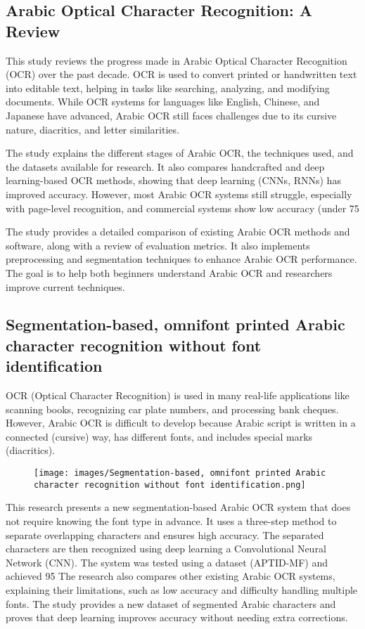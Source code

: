 \documentclass{article}
\begin{document}
\subsection{Arabic Optical Character Recognition: A Review}
This study reviews the progress made in Arabic Optical Character Recognition (OCR) over the past decade. OCR is used to convert printed or handwritten text into editable text, helping in tasks like searching, analyzing, and modifying documents. While OCR systems for languages like English, Chinese, and Japanese have advanced, Arabic OCR still faces challenges due to its cursive nature, diacritics, and letter similarities.  

The study explains the different stages of Arabic OCR, the techniques used, and the datasets available for research. It also compares handcrafted and deep learning-based OCR methods, showing that deep learning (CNNs, RNNs) has improved accuracy. However, most Arabic OCR systems still struggle, especially with page-level recognition, and commercial systems show low accuracy (under 75%

The study provides a detailed comparison of existing Arabic OCR methods and software, along with a review of evaluation metrics. It also implements preprocessing and segmentation techniques to enhance Arabic OCR performance. The goal is to help both beginners understand Arabic OCR and researchers improve current techniques.
\subsection{Segmentation-based, omnifont printed Arabic character recognition without font identification}OCR (Optical Character Recognition) is used in many real-life applications like scanning books, recognizing car plate numbers, and processing bank cheques. However, Arabic OCR is difficult to develop because Arabic script is written in a connected (cursive) way, has different fonts, and includes special marks (diacritics).
 \begin{figure}[H]
     \centering
     \texttt{[image: images/Segmentation-based, omnifont printed Arabic character recognition without font identification.png]}
     \label{fig:enter-label}
 \end{figure}
This research presents a new segmentation-based Arabic OCR system that does not require knowing the font type in advance. It uses a three-step method to separate overlapping characters and ensures high accuracy. The separated characters are then recognized using deep learning a Convolutional Neural Network  (CNN). The system was tested using a dataset (APTID-MF) and achieved 95%
The research also compares other existing Arabic OCR systems, explaining their limitations, such as low accuracy and difficulty handling multiple fonts. The study provides a new dataset of segmented Arabic characters and proves that deep learning improves accuracy without needing extra corrections.
\end{document}
